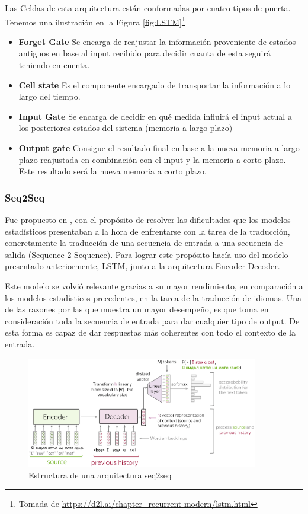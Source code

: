 Las Celdas de esta arquitectura están conformadas por cuatro tipos de puerta. Tenemos una ilustración en la Figura \ref{fig:LSTM}\footnote{Tomada de \url{https://d2l.ai/chapter_recurrent-modern/lstm.html}}
\begin{itemize}
	\item\textbf{Forget Gate} Se encarga de reajustar la información proveniente de estados antiguos en base al input recibido para decidir cuanta de esta seguirá teniendo en cuenta.
	\item\textbf{Cell state} Es el componente encargado de transportar la información a lo largo del tiempo.
	\item\textbf{Input Gate} Se encarga de decidir en qué medida influirá el input actual a los posteriores estados del sistema (memoria a largo plazo)
	\item\textbf{Output gate} Consigue el resultado final en base a la nueva memoria a largo plazo reajustada en combinación con el input y la memoria a corto plazo. Este resultado será la nueva memoria a corto plazo.
\end{itemize}

\subsubsection{Seq2Seq}

Fue propuesto en \cite{sutskever2014sequence}, con el propósito de resolver las dificultades que los modelos estadísticos presentaban a la hora de enfrentarse con la tarea de la traducción, concretamente la traducción de una secuencia de entrada a una secuencia de salida (Sequence 2 Sequence). Para lograr este propósito hacía uso del modelo presentado anteriormente, LSTM, junto a la arquitectura Encoder-Decoder. 

Este modelo se volvió relevante gracias a su mayor rendimiento, en comparación a los modelos estadísticos precedentes, en la tarea de la traducción de idiomas. Una de las razones por las que muestra un mayor desempeño, es que toma en consideración toda la secuencia de entrada para dar cualquier tipo de output. De esta forma es capaz de dar respuestas más coherentes con todo el contexto de la entrada.

\begin{figure}[h]
	\centering
	\includegraphics[width = 0.9\textwidth]{Imagenes/Vectorial/seq2seq.pdf}
	\caption{Estructura de una arquitectura seq2seq}%
	\label{fig:seq2seq}
\end{figure}

